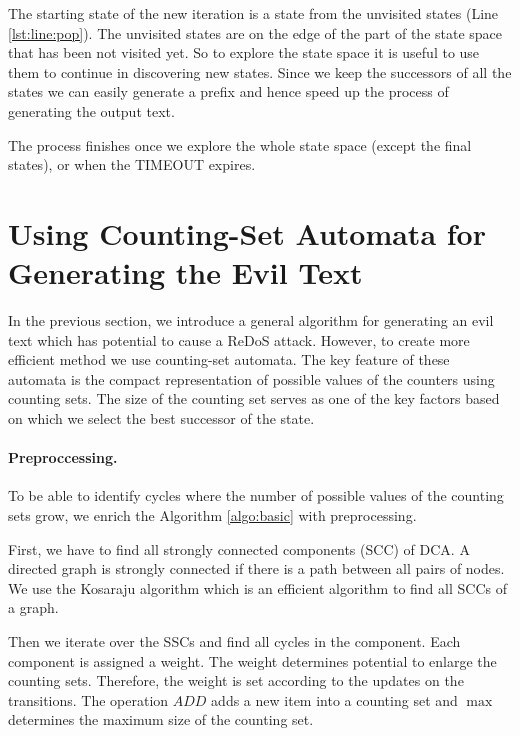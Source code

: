 \documentclass[acmsmall,screen]{acmart}
\begin{document}
The starting state of the new iteration is a state from the unvisited states (Line \ref{lst:line:pop}). 
%
The unvisited states are on the edge of the part of the state space that has been not visited yet. 
%
So to explore the state space it is useful to use them to continue in discovering new states.
%
Since we keep the successors of all the states we can easily generate a prefix 
%
and hence speed up the process of generating the output text.

The process finishes once we explore the whole state space (except the final states), or when the TIMEOUT expires.
  



\section{Using Counting-Set Automata for Generating the Evil Text}\label{sec:genText}
In the previous section, we introduce a general algorithm for generating an evil text which has potential to cause a ReDoS attack. 
%
However, to create more efficient method we use counting-set automata.
%
The key feature of these automata is the compact representation of possible values of the counters using counting sets.
%
The size of the counting set serves as one of the key factors based on which we select the best successor of the state.

\paragraph{Preproccessing.}
To be able to identify cycles where the number of possible values of the counting sets grow, we enrich the Algorithm \ref{algo:basic} with preprocessing. 

First, we have to find all strongly connected components (SCC) of DCA. 
%
A directed graph is strongly connected if there is a path between all pairs of nodes. 
%
We use the Kosaraju algorithm which is an efficient algorithm to find all SCCs of a graph.

% 
Then we iterate over the SSCs and find all cycles in the component. 
%
Each component is assigned a weight.
%
The weight determines potential to enlarge the counting sets.
%
Therefore, the weight is set according to the updates on the transitions.
%
The operation $ADD$ adds a new item into a counting set and $\max$ determines the maximum size of the counting set.
\end{document}
